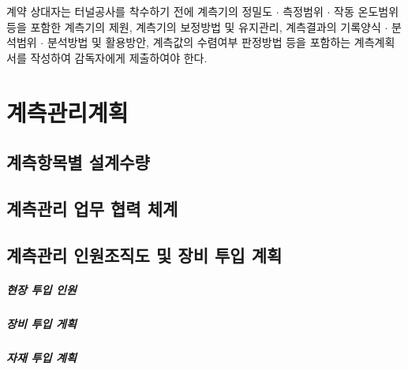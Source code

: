 		\begin{mdframed}[style=con_specification, frametitle={\large 일반국도공사 전문시방서}]
계약 상대자는 터널공사를 착수하기 전에 계측기의 정밀도 $\cdot$ 측정범위 $\cdot$ 작동 온도범위 등을 포함한 계측기의 제원, 계측기의 보정방법 및 유지관리, 계측결과의 기록양식 $\cdot$ 분석범위 $\cdot$ 분석방법 및 활용방안, 계측값의 수렴여부 판정방법 등을 포함하는 계측계획서를 작성하여 감독자에게 제출하여야 한다.
		\end{mdframed}

		

	\chapter{계측관리계획}
	\minitoc				%
		

	\section{계측항목별 설계수량}
		
		
	\section{계측관리 업무 협력 체계}
		
		
	\section{계측관리 인원조직도 및 장비 투입 계획}
		
		\paragraph{현장 투입 인원}


		\paragraph{장비 투입 게획}
		

		\paragraph{자재 투입 계획}
		

